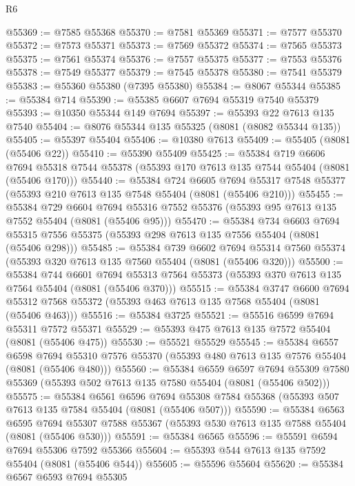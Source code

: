 \begin{lexlean}{R6}
\begin{coremodule}
@55369 := @7585 @55368
@55370 := @7581 @55369
@55371 := @7577 @55370
@55372 := @7573 @55371
@55373 := @7569 @55372
@55374 := @7565 @55373
@55375 := @7561 @55374
@55376 := @7557 @55375
@55377 := @7553 @55376
@55378 := @7549 @55377
@55379 := @7545 @55378
@55380 := @7541 @55379
@55383 := @55360 @55380 (@7395 @55380)
@55384 := @8067 @55344
@55385 := @55384 @714
@55390 := @55385 @6607 @7694 @55319 @7540 @55379
@55393 := @10350 @55344 @149 @7694
@55397 := @55393 @22 @7613 @135 @7540
@55404 := @8076 @55344 @135 @55325 (@8081 (@8082 @55344 @135))
@55405 := @55397 @55404
@55406 := @10380 @7613
@55409 := @55405 (@8081 (@55406 @22))
@55410 := @55390 @55409
@55425 := @55384
    @719
    @6606
    @7694
    @55318
    @7544
    @55378
    (@55393 @170 @7613 @135 @7544 @55404 (@8081 (@55406 @170)))
@55440 := @55384
    @724
    @6605
    @7694
    @55317
    @7548
    @55377
    (@55393 @210 @7613 @135 @7548 @55404 (@8081 (@55406 @210)))
@55455 := @55384
    @729
    @6604
    @7694
    @55316
    @7552
    @55376
    (@55393 @95 @7613 @135 @7552 @55404 (@8081 (@55406 @95)))
@55470 := @55384
    @734
    @6603
    @7694
    @55315
    @7556
    @55375
    (@55393 @298 @7613 @135 @7556 @55404 (@8081 (@55406 @298)))
@55485 := @55384
    @739
    @6602
    @7694
    @55314
    @7560
    @55374
    (@55393 @320 @7613 @135 @7560 @55404 (@8081 (@55406 @320)))
@55500 := @55384
    @744
    @6601
    @7694
    @55313
    @7564
    @55373
    (@55393 @370 @7613 @135 @7564 @55404 (@8081 (@55406 @370)))
@55515 := @55384
    @3747
    @6600
    @7694
    @55312
    @7568
    @55372
    (@55393 @463 @7613 @135 @7568 @55404 (@8081 (@55406 @463)))
@55516 := @55384 @3725
@55521 := @55516 @6599 @7694 @55311 @7572 @55371
@55529 := @55393 @475 @7613 @135 @7572 @55404 (@8081 (@55406 @475))
@55530 := @55521 @55529
@55545 := @55384
    @6557
    @6598
    @7694
    @55310
    @7576
    @55370
    (@55393 @480 @7613 @135 @7576 @55404 (@8081 (@55406 @480)))
@55560 := @55384
    @6559
    @6597
    @7694
    @55309
    @7580
    @55369
    (@55393 @502 @7613 @135 @7580 @55404 (@8081 (@55406 @502)))
@55575 := @55384
    @6561
    @6596
    @7694
    @55308
    @7584
    @55368
    (@55393 @507 @7613 @135 @7584 @55404 (@8081 (@55406 @507)))
@55590 := @55384
    @6563
    @6595
    @7694
    @55307
    @7588
    @55367
    (@55393 @530 @7613 @135 @7588 @55404 (@8081 (@55406 @530)))
@55591 := @55384 @6565
@55596 := @55591 @6594 @7694 @55306 @7592 @55366
@55604 := @55393 @544 @7613 @135 @7592 @55404 (@8081 (@55406 @544))
@55605 := @55596 @55604
@55620 := @55384
    @6567
    @6593
    @7694
    @55305

\end{coremodule}
\end{lexlean}
